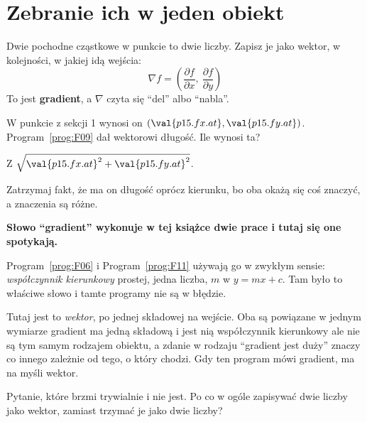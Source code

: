 \section{Zebranie ich w jeden obiekt}
\label{sec:P15-gradient}

\begin{fr}
Dwie pochodne cząstkowe w punkcie to dwie liczby. Zapisz je jako wektor, w
kolejności, w jakiej idą wejścia:
\[ \nabla f = \left(\frac{\partial f}{\partial x},\
                    \frac{\partial f}{\partial y}\right) \]
To jest \textbf{gradient}, a $\nabla$ czyta się \enquote{del} albo
\enquote{nabla}.

W punkcie z sekcji 1 wynosi on $(\val{p15.fx.at}, \val{p15.fy.at})$.
Program~\ref{prog:F09} dał wektorowi długość. Ile wynosi ta?
\dotline
\nextframe
\end{fr}

\begin{fr}
Z $\sqrt{\val{p15.fx.at}^{2} + \val{p15.fy.at}^{2}}$.

Zatrzymaj fakt, że ma on długość oprócz kierunku, bo oba okażą się coś
znaczyć, a znaczenia są różne.

\begin{notationbox}
\textbf{Słowo \enquote{gradient} wykonuje w tej książce dwie prace i tutaj się
one spotykają.}

Program~\ref{prog:F06} i Program~\ref{prog:F11} używają go w zwykłym sensie:
\emph{współczynnik kierunkowy} prostej, jedna liczba, $m$ w $y = mx + c$. Tam
było to właściwe słowo i tamte programy nie są w błędzie.

Tutaj jest to \emph{wektor}, po jednej składowej na wejście. Oba są powiązane
\dash{} w jednym wymiarze gradient ma jedną składową i jest nią współczynnik
kierunkowy \dash{} ale nie są tym samym rodzajem obiektu, a zdanie w rodzaju
\enquote{gradient jest duży} znaczy co innego zależnie od tego, o który
chodzi. Gdy ten program mówi gradient, ma na myśli wektor.
\end{notationbox}
\end{fr}

\begin{fr}
Pytanie, które brzmi trywialnie i nie jest. Po co w ogóle zapisywać dwie
liczby jako wektor, zamiast trzymać je jako dwie liczby?
\dotline
\nextframe
\end{fr}

